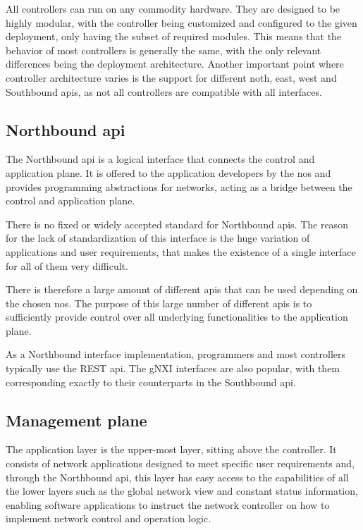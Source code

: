 All controllers can run on any commodity hardware\cite{kreutz_software-defined_2015}. They are designed to be highly modular, with the controller being customized and configured to the given deployment, only having the subset of required modules\cite{peterson_software-defined_2021}. This means that the behavior of most controllers is generally the same, with the only relevant differences being the deployment architecture. Another important point where controller architecture varies is the support for different noth, east, west and Southbound \glspl{api}, as not all controllers are compatible with all interfaces. 

\subsection[Northbound API]{Northbound \gls{api}} %
The Northbound \gls{api} is a logical interface that connects the control and application plane. It is offered to the application developers by the \gls{nos}\cite{kreutz_software-defined_2015} and provides programming abstractions for networks, acting as a bridge between the control and application plane\cite{latif_comprehensive_2020}.

There is no fixed or widely accepted standard for Northbound \glspl{api}\cite{kreutz_software-defined_2015}\cite{latif_comprehensive_2020}. The reason for the lack of standardization of this interface is the huge variation of applications and user requirements, that makes the existence of a single interface for all of them very difficult.

There is therefore a large amount of different \glspl{api} that can be used depending on the chosen \gls{nos}. The purpose of this large number of different \glspl{api} is to sufficiently provide control over all underlying functionalities to the application plane\cite{peterson_software-defined_2021}.

As a Northbound interface implementation, programmers and most controllers typically use the REST \gls{api}\cite{latif_comprehensive_2020}. The gNXI interfaces are also popular, with them corresponding exactly to their counterparts in the Southbound \gls{api}\cite{peterson_software-defined_2021}. 
        

\subsection{Management plane} %
The application layer is the upper-most layer, sitting above the controller. It consists of network applications designed to meet specific user requirements and, through the Northbound \gls{api}, this layer has easy access to the capabilities of all the lower layers such as the global network view and constant status information, enabling software applications to instruct the network controller on how to implement network control and operation logic\cite{xia_survey_2015}\cite{liatifis_advancing_2023}. 

